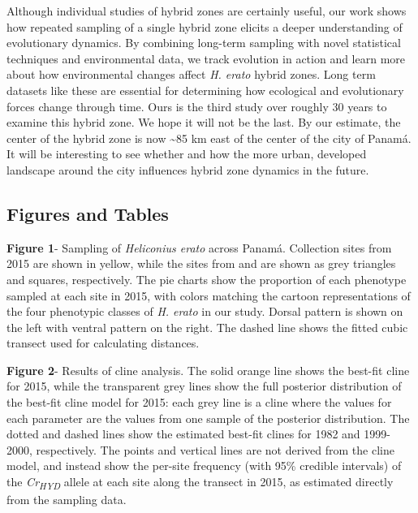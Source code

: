 \documentclass[]{article}
\begin{document}
Although individual studies of hybrid zones are certainly useful, our
work shows how repeated sampling of a single hybrid zone elicits a
deeper understanding of evolutionary dynamics. By combining long-term
sampling with novel statistical techniques and environmental data, we
track evolution in action and learn more about how environmental changes
affect \textit{H. erato} hybrid zones. Long term datasets like these are
essential for determining how ecological and evolutionary forces change
through time. Ours is the third study over roughly 30 years to examine
this hybrid zone. We hope it will not be the last. By our estimate, the
center of the hybrid zone is now \textasciitilde{}85 km east of the
center of the city of Panamá. It will be interesting to see whether and
how the more urban, developed landscape around the city influences
hybrid zone dynamics in the future.



\nolinenumbers
\pagebreak
{}

\subsection{Figures and Tables}\label{figures-and-tables}

\textbf{Figure 1}- Sampling of \textit{Heliconius erato} across Panamá.
Collection sites from 2015 are shown in yellow, while the sites from
\citet{Mallet:1986vj} and \citet{Blum:2002wr} are shown as grey
triangles and squares, respectively. The pie charts show the proportion
of each phenotype sampled at each site in 2015, with colors matching the
cartoon representations of the four phenotypic classes of
\textit{H. erato} in our study. Dorsal pattern is shown on the left with
ventral pattern on the right. The dashed line shows the fitted cubic
transect used for calculating distances.

\textbf{Figure 2}- Results of cline analysis. The solid orange line
shows the best-fit cline for 2015, while the transparent grey lines show
the full posterior distribution of the best-fit cline model for 2015:
each grey line is a cline where the values for each parameter are the
values from one sample of the posterior distribution. The dotted and
dashed lines show the estimated best-fit clines for 1982 and 1999-2000,
respectively. The points and vertical lines are not derived from the
cline model, and instead show the per-site frequency (with 95\% credible
intervals) of the \textit{Cr\textsubscript{HYD}} allele at each site
along the transect in 2015, as estimated directly from the sampling
data.
\end{document}
